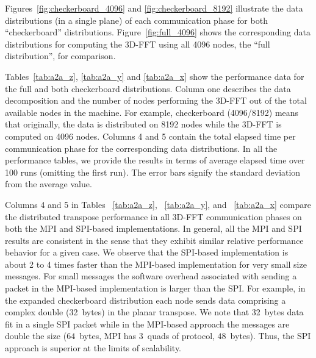 Figures~\ref{fig:checkerboard_4096} and \ref{fig:checkerboard_8192}
illustrate the data distributions (in a single plane) of each
communication phase for both ``checkerboard'' distributions. 
Figure~\ref{fig:full_4096} shows the corresponding data distributions
for computing the 3D-FFT using all 4096 nodes, the ``full
distribution'', for comparison.

Tables~\ref{tab:a2a_z}, \ref{tab:a2a_y} and \ref{tab:a2a_x} show the
performance data for the full and both checkerboard distributions.
Column one describes the data decomposition and the number of nodes
performing the 3D-FFT out of the total available nodes in the machine.
For example, checkerboard (4096/8192) means that originally, the data
is distributed on 8192 nodes while the 3D-FFT is computed on 4096
nodes. Columns 4 and 5 contain the total elapsed time per
communication phase for the corresponding data distributions.  In all
the performance tables, we provide the results in terms of average elapsed
time over 100 runs (omitting the first run).  The error bars signify the standard deviation
from the average value.

Columns 4 and 5 in Tables ~\ref{tab:a2a_z}, ~\ref{tab:a2a_y}, and
~\ref{tab:a2a_x} compare the distributed transpose performance in all
3D-FFT communication phases on both the MPI and SPI-based
implementations.  In general, all the MPI and SPI results are
consistent in the sense that they exhibit similar relative performance
behavior for a given case.  We observe that the SPI-based \alltoall
implementation is about 2 to 4 times faster than the MPI-based
implementation for very small size messages. For small messages the
software overhead associated with sending a packet in the MPI-based
implementation is larger than the SPI. For example, in the expanded
checkerboard distribution each node sends data comprising a complex double
(32~bytes) in the planar transpose.  We note that 32~bytes data fit in
a single SPI packet while in the MPI-based approach
the messages are double the size ($64$~bytes, MPI has 3~quads of protocol, $48$~bytes). %
Thus, the SPI approach is superior at the limits of scalability.

